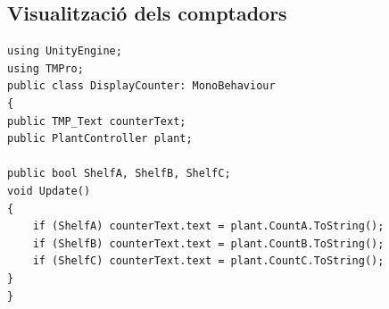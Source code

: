 \documentclass[a4paper,11pt,DIV=13,headings=normal,abstract=true,twoside=semi]{article}
\begin{document}
\subsection*{Visualització dels comptadors}


\begin{lstlisting}[style=modern, caption={Visualització dels comptadors}, label={lst:displaycounter}]
using UnityEngine;
using TMPro;
public class DisplayCounter: MonoBehaviour
{
public TMP_Text counterText;
public PlantController plant;

public bool ShelfA, ShelfB, ShelfC;
void Update()
{
    if (ShelfA) counterText.text = plant.CountA.ToString();
    if (ShelfB) counterText.text = plant.CountB.ToString();
    if (ShelfC) counterText.text = plant.CountC.ToString();
}
}

\end{lstlisting}
\end{document}
